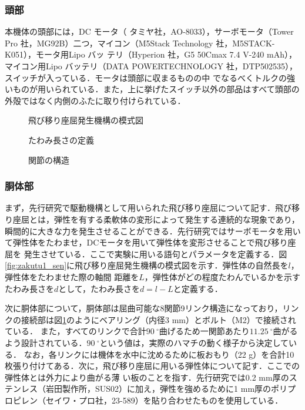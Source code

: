 \subsubsection{頭部}
本機体の頭部には，DC モータ（ タミヤ社，AO-8033），サーボモータ（Tower Pro 社，MG92B）二つ，マイコン（M5Stack Technology 社，M5STACK-K051），モータ用Lipo バッ
テリ（Hyperion 社，G5 50Cmax 7.4 V-240 mAh），マイコン用Lipo バッテリ（DATA POWERTECHNOLOGY 社，DTP502535），スイッチが入っている．モータは頭部に収まるものの中
でなるべくトルクの強いものが用いられている．また，上に挙げたスイッチ以外の部品はすべて頭部の外殻ではなく内側のふたに取り付けられている．

\begin{figure}[t]
    \centering
     \begin{minipage}[b]{0.45\linewidth}
        \centering
        \caption{飛び移り座屈発生機構の模式図\cite{kyu}}
        \label{fig:zakutu1_sen}
     \end{minipage}
     \begin{minipage}[b]{0.35\linewidth}
        \centering
        \caption{たわみ長さの定義\cite{kyu}}
        \label{fig:zakutu2_sen}
     \end{minipage}
     \begin{minipage}[b]{0.15\linewidth}
        \centering
        \caption{関節の構造\cite{kyu}}
        \label{fig:kansetu}
     \end{minipage}
\end{figure}

\subsubsection{胴体部}
まず，先行研究\cite{kyu}で駆動機構として用いられた飛び移り座屈について記す．飛び移り座屈とは，弾性を有する柔軟体の変形によって発生する連続的な現象であり，
瞬間的に大きな力を発生させることができる．先行研究ではサーボモータを用いて弾性体をたわませ，DCモータを用いて弾性体を変形させることで飛び移り座屈を
発生させている．ここで実験に用いる語句とパラメータを定義する．図\ref{fig:zakutu1_sen}に飛び移り座屈発生機構の模式図を示す．弾性体の自然長を$l$，弾性体をたわませた際の軸間
距離を$L$，弾性体がどの程度たわんでいるかを示すたわみ長さを$d$として，たわみ長さを$d=l−L$と定義する．

次に胴体部について，胴体部は屈曲可能な8関節9リンク構造になっており，リンクの接続部は図\ref{fig:kansetu}のようにベアリング（内径3 mm）とボルト（M2）で接続されている．
また，すべてのリンクで合計$90\:^\circ$曲げるため一関節あたり$11.25\:^\circ$曲がるよう設計されている．$90\:^\circ$という値は，実際のハマチの動く様子から決定している．
なお，各リンクには機体を水中に沈めるために板おもり（22 g）を合計10 枚張り付けてある．次に，飛び移り座屈に用いる弾性体について記す．ここでの弾性体とは外力により曲がる薄
い板のことを指す．先行研究では0.2 mm厚のステンレス（岩田製作所，SUS02）に加え，弾性を強めるために1 mm厚のポリプロピレン（セイワ・プロ社，23-589）を貼り合わせたものを使用している．

